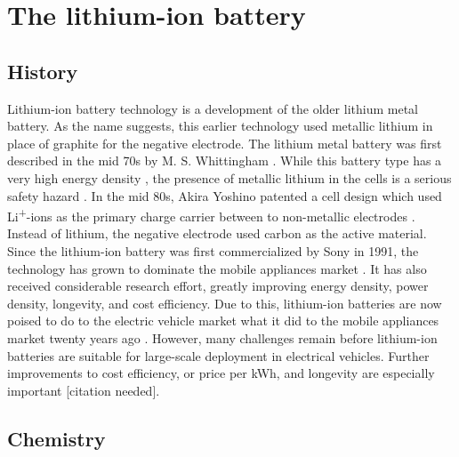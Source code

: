\documentclass[12pt]{article} %
\begin{document}

\section{The lithium-ion battery} %


\subsection{History} %

Lithium-ion battery technology is a development of the older lithium metal battery.
As the name suggests, this earlier technology used metallic lithium in place of graphite for the negative electrode.
The lithium metal battery was first described in the mid 70s by M. S. Whittingham \cite{whittingham_electrical_1976}.
While this battery type has a very high energy density \cite{van_schalkwijk_chapter_2002}, the presence of metallic lithium in the cells is a serious safety hazard \cite{lisbona_review_2011} \cite{eom_life_2007}.
In the mid 80s, Akira Yoshino patented a cell design which used Li\textsuperscript{+}-ions as the primary charge carrier between to non-metallic electrodes \cite{yoshio_chapter_2009} \cite{yoshino_secondary_1987}.
Instead of lithium, the negative electrode used carbon as the active material.
Since the lithium-ion battery was first commercialized by Sony in 1991, the technology has grown to dominate the mobile appliances market \cite{yoshio_chapter_2009-1}.
It has also received considerable research effort, greatly improving energy density, power density, longevity, and cost efficiency.
Due to this, lithium-ion batteries are now poised to do to the electric vehicle market what it did to the mobile appliances market twenty years ago \cite{reddy_thomas_section_2011}.
However, many challenges remain before lithium-ion batteries are suitable for large-scale deployment in electrical vehicles.
Further improvements to cost efficiency, or price per kWh, and longevity are especially important [citation needed].


\subsection{Chemistry} %
\end{document}
